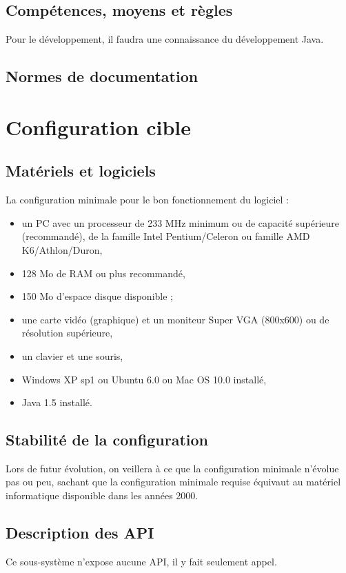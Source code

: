 \subsection{Compétences, moyens et règles}
Pour le développement, il faudra une connaissance du développement Java.
\subsection{Normes de documentation}

\section{Configuration cible}
\subsection{Matériels et logiciels}
La configuration minimale pour le bon fonctionnement du logiciel : 
\begin{itemize}
	\item un PC avec un processeur de 233 MHz minimum ou de capacité supérieure (recommandé), de la famille Intel Pentium/Celeron ou famille AMD K6/Athlon/Duron,
	\item 128 Mo de RAM ou plus recommandé,
	\item 150 Mo d'espace disque disponible ;
	\item une carte vidéo (graphique) et un moniteur Super VGA (800x600) ou de résolution supérieure,
	\item un clavier et une souris,
	\item Windows XP sp1 ou Ubuntu 6.0 ou Mac OS 10.0 installé,
	\item Java 1.5 installé.
\end{itemize}

\subsection{Stabilité de la configuration}
Lors de futur évolution, on veillera à ce que la configuration minimale n'évolue pas ou peu, sachant que la configuration minimale requise équivaut au matériel informatique disponible dans les années 2000.

\subsection{Description des API}
Ce sous-système n'expose aucune API, il y fait seulement appel.

